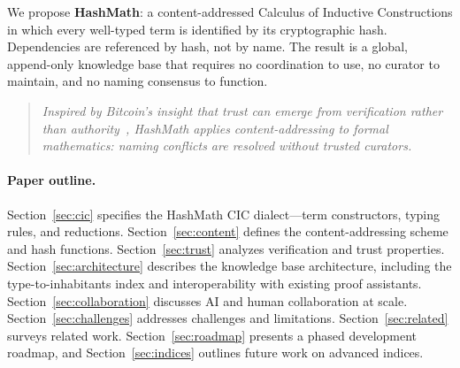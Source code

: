\documentclass[11pt]{article}
\theoremstyle{definition}
\theoremstyle{plain}
\theoremstyle{remark}
\begin{document}
We propose \textbf{HashMath}: a content-addressed Calculus of Inductive Constructions in which
every well-typed term is identified by its cryptographic hash.
Dependencies are referenced by hash, not by name.
The result is a global, append-only knowledge base that requires no coordination to use,
no curator to maintain, and no naming consensus to function.

\begin{quote}
\emph{Inspired by Bitcoin's insight that trust can emerge from verification rather than
authority~\cite{nakamoto2008}, HashMath applies content-addressing to formal mathematics:
naming conflicts are resolved without trusted curators.}
\end{quote}

\paragraph{Paper outline.}
Section~\ref{sec:cic} specifies the HashMath CIC dialect---term constructors, typing rules,
and reductions.
Section~\ref{sec:content} defines the content-addressing scheme and hash functions.
Section~\ref{sec:trust} analyzes verification and trust properties.
Section~\ref{sec:architecture} describes the knowledge base architecture, including the
type-to-inhabitants index and interoperability with existing proof assistants.
Section~\ref{sec:collaboration} discusses AI and human collaboration at scale.
Section~\ref{sec:challenges} addresses challenges and limitations.
Section~\ref{sec:related} surveys related work.
Section~\ref{sec:roadmap} presents a phased development roadmap, and
Section~\ref{sec:indices} outlines future work on advanced indices.
\end{document}
